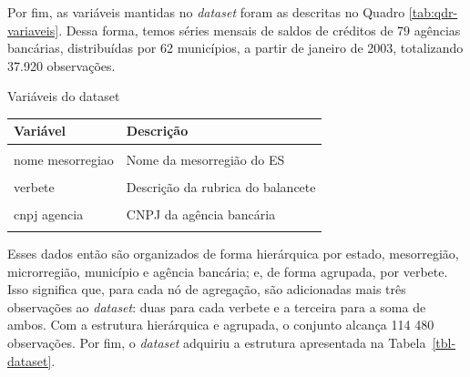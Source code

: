 \documentclass[
  12pt,
  twoside,
  openright,
  a4paper,
  chapter=TITLE,
  section=TITLE,
  brazil]{abntex2}
\begin{document}
Por fim, as variáveis mantidas no \emph{dataset} foram as descritas no
Quadro \ref{tab:qdr-variaveis}. Dessa forma, temos séries mensais de
saldos de créditos de 79 agências bancárias, distribuídas por 62
municípios, a partir de janeiro de 2003, totalizando 37.920 observações.

\begin{quadro}

  \caption{\label{tab:qdr-variaveis}Variáveis do dataset}
  \centering
  \fontsize{12}{14}\selectfont
  \begin{tabular}[t]{l>{\raggedright\arraybackslash}p{10cm}}
  \toprule
  Variável & Descrição\\
  \midrule
  \cellcolor{gray!6}{ref} & \cellcolor{gray!6}{Data de referência do relatório  ESTBAN}\\
  nome mesorregiao & Nome da mesorregião do ES\\
  \cellcolor{gray!6}{nome microrregiao} & \cellcolor{gray!6}{Nome da microrregião   do ES}\\
  verbete & Descrição da rubrica do balancete\\
  \cellcolor{gray!6}{nome} & \cellcolor{gray!6}{Nome do município}\\
  \addlinespace
  cnpj agencia & CNPJ da agência bancária\\
  \cellcolor{gray!6}{saldo} & \cellcolor{gray!6}{Saldo do verbete}\\
  \bottomrule
  \end{tabular}
\end{quadro}

Esses dados então são organizados de forma hierárquica por estado,
mesorregião, microrregião, município e agência bancária; e, de forma
agrupada, por verbete. Isso significa que, para cada nó de agregação,
são adicionadas mais três observações ao \emph{dataset}: duas para cada
verbete e a terceira para a soma de ambos. Com a estrutura hierárquica e
agrupada, o conjunto alcança 114 480 observações. Por fim, o
\emph{dataset} adquiriu a estrutura apresentada na
Tabela~\ref{tbl-dataset}.
\end{document}
